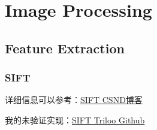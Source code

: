 \chapter{Image Processing}

\section{Feature Extraction}

\subsection{SIFT}

详细信息可以参考：\href{https://blog.csdn.net/abcjennifer/article/details/7639681}{SIFT CSND博客}

我的未验证实现：\href{https://github.com/TriLoo/HR-SLAM/tree/master/Tools/FeatureDetections}{SIFT Triloo Github}


